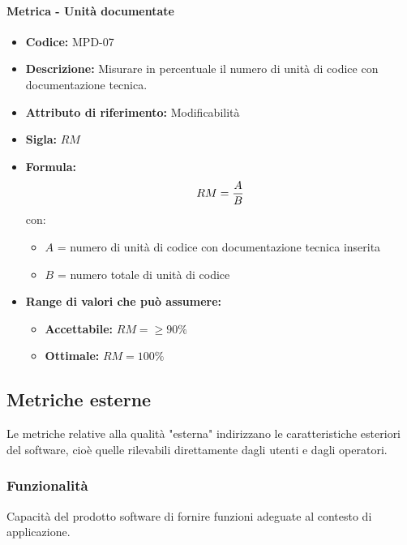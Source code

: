 \paragraph{Metrica - Unità documentate} 
   \begin{itemize}
          \item  \textbf{Codice:} MPD-07
         \item   \textbf{Descrizione:} Misurare in percentuale il numero di unità di codice con documentazione tecnica.
         \item   \textbf{Attributo di riferimento:} Modificabilità
         \item   \textbf{Sigla:} $RM$
         \item   \textbf{Formula:} $$RM = {A \over B}$$
         con:
         \begin{itemize}
            \item $A$ = numero di unità di codice con documentazione tecnica inserita 
            \item $B$ = numero totale di unità di codice
                     \end{itemize}

        \item \textbf{Range di valori che può assumere:}
        \begin{itemize}
            \item \textbf{Accettabile:} $RM = \geq90\%  $
            \item \textbf{Ottimale:} $RM = 100\%$
        \end{itemize}
       \end{itemize}
              
       
\subsection{Metriche esterne}
Le metriche relative alla qualità "esterna" indirizzano le caratteristiche esteriori del software, cioè quelle rilevabili direttamente dagli utenti e dagli operatori.
   \subsubsection{Funzionalità}
   Capacità del prodotto software di fornire funzioni adeguate al contesto di applicazione.
   
